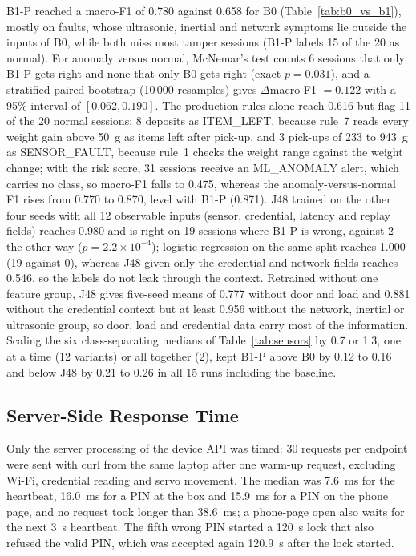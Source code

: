 \documentclass[sigconf,screen]{acmart}
\begin{document}
B1-P reached a macro-F1 of 0.780 against 0.658 for B0 (Table~\ref{tab:b0_vs_b1}), mostly on faults, whose ultrasonic,
inertial and network symptoms lie outside the inputs of B0, while both miss most tamper sessions (B1-P labels 15 of the
20 as normal). For anomaly versus normal, McNemar's test counts 6 sessions that only B1-P gets right and none that only
B0 gets right (exact $p=0.031$), and a stratified paired bootstrap (10\,000 resamples) gives $\Delta$macro-F1 $=0.122$
with a 95\% interval of $[0.062, 0.190]$. The production rules alone reach 0.616 but flag 11 of the 20 normal
sessions: 8 deposits as ITEM\_LEFT, because rule~7 reads every weight gain above 50~g as items left after pick-up, and
3 pick-ups of 233 to 943~g as SENSOR\_FAULT, because rule~1 checks the weight range against the weight change; with the
risk score, 31 sessions
receive an ML\_ANOMALY alert, which carries no class, so macro-F1 falls to 0.475, whereas the anomaly-versus-normal F1
rises from 0.770 to 0.870, level with B1-P (0.871). J48 trained on the other four seeds with all 12 observable
inputs (sensor, credential, latency and replay fields) reaches 0.980 and is right on 19 sessions where B1-P is wrong, against 2 the other way ($p=2.2\times10^{-4}$); logistic
regression on the same split reaches 1.000 (19 against 0), whereas J48 given only the credential and network fields
reaches 0.546, so the labels do not leak through the context. Retrained without one feature group, J48 gives five-seed
means of 0.777 without door and load and 0.881 without the credential context but at least 0.956 without the network, inertial or
ultrasonic group, so door, load and credential data carry most of the information. Scaling the six class-separating
medians of Table~\ref{tab:sensors} by 0.7 or 1.3, one at a time (12 variants) or all together (2), kept B1-P above B0
by 0.12 to 0.16 and below J48 by 0.21 to 0.26 in all 15 runs including the baseline.

\subsection{Server-Side Response Time}\label{sec:latency}

Only the server processing of the device API was timed: 30 requests per endpoint were sent with curl from the same
laptop after one warm-up request, excluding Wi-Fi, credential reading and servo movement. The median was 7.6~ms for the
heartbeat, 16.0~ms for a PIN at the box and 15.9~ms for a PIN on the phone page, and no request took longer than
38.6~ms; a phone-page open also waits for the next 3~s heartbeat. The fifth wrong PIN started a 120~s lock that also
refused the valid PIN, which was accepted again 120.9~s after the lock started.
\end{document}
